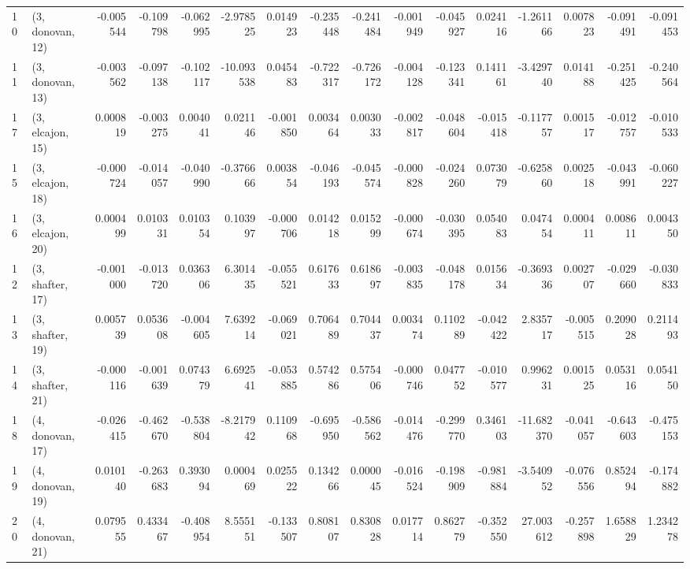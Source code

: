 \begin{tabular}{llrrrrrrrrrrrrrr}
10 &  (3, donovan, 12) &  -0.005544 & -0.109798 & -0.062995 &  -2.978525 &  0.014923 &  -0.235448 & -0.241484 & -0.001949 & -0.045927 &  0.024116 &  -1.261166 &  0.007823 & -0.091491 & -0.091453 \\
11 &  (3, donovan, 13) &  -0.003562 & -0.097138 & -0.102117 & -10.093538 &  0.045483 &  -0.722317 & -0.726172 & -0.004128 & -0.123341 &  0.141161 &  -3.429740 &  0.014188 & -0.251425 & -0.240564 \\
17 &  (3, elcajon, 15) &   0.000819 & -0.003275 &  0.004041 &   0.021146 & -0.001850 &   0.003464 &  0.003033 & -0.002817 & -0.048604 & -0.015418 &  -0.117757 &  0.001517 & -0.012757 & -0.010533 \\
15 &  (3, elcajon, 18) &  -0.000724 & -0.014057 & -0.040990 &  -0.376666 &  0.003854 &  -0.046193 & -0.045574 & -0.000828 & -0.024260 &  0.073079 &  -0.625860 &  0.002518 & -0.043991 & -0.060227 \\
16 &  (3, elcajon, 20) &   0.000499 &  0.010331 &  0.010354 &   0.103997 & -0.000706 &   0.014218 &  0.015299 & -0.000674 & -0.030395 &  0.054083 &   0.047454 &  0.000411 &  0.008611 &  0.004350 \\
12 &  (3, shafter, 17) &  -0.001000 & -0.013720 &  0.036306 &   6.301435 & -0.055521 &   0.617633 &  0.618697 & -0.003835 & -0.048178 &  0.015634 &  -0.369336 &  0.002707 & -0.029660 & -0.030833 \\
13 &  (3, shafter, 19) &   0.005739 &  0.053608 & -0.004605 &   7.639214 & -0.069021 &   0.706489 &  0.704437 &  0.003474 &  0.110289 & -0.042422 &   2.835717 & -0.005515 &  0.209028 &  0.211493 \\
14 &  (3, shafter, 21) &  -0.000116 & -0.001639 &  0.074379 &   6.692541 & -0.053885 &   0.574286 &  0.575406 & -0.000746 &  0.047752 & -0.010577 &   0.996231 &  0.001525 &  0.053116 &  0.054150 \\
18 &  (4, donovan, 17) &  -0.026415 & -0.462670 & -0.538804 &  -8.217942 &  0.110968 &  -0.695950 & -0.586562 & -0.014476 & -0.299770 &  0.346103 & -11.682370 & -0.041057 & -0.643603 & -0.475153 \\
19 &  (4, donovan, 19) &   0.010140 & -0.263683 &  0.393094 &   0.000469 &  0.025522 &   0.134266 &  0.000045 & -0.016524 & -0.198909 & -0.981884 &  -3.540952 & -0.076556 &  0.852494 & -0.174882 \\
20 &  (4, donovan, 21) &   0.079555 &  0.433467 & -0.408954 &   8.555151 & -0.133507 &   0.808107 &  0.830828 &  0.017714 &  0.862779 & -0.352550 &  27.003612 & -0.257898 &  1.658829 &  1.234278 \\

\end{tabular}
